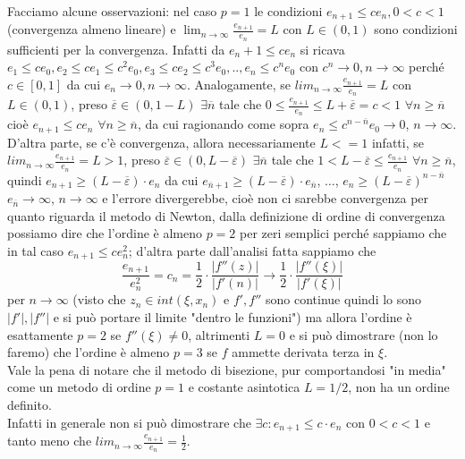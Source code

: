 \documentclass[12pt]{article}
\begin{document}
Facciamo alcune osservazioni: nel caso $p=1$ le condizioni $e_{n+1} \leq ce_n, 0<c<1$  (convergenza almeno lineare) e $\lim_{n\to\infty}{\frac{e_{n+1}}{e_n}}=L$ con $L\in(0,1)$ sono condizioni sufficienti per la convergenza. Infatti da $e_n+1\leq ce_n$ si ricava $e_1\leq ce_0, e_2\leq ce_1\leq c^2e_0, e_3 \leq ce_2 \leq c^3e_0,..,e_n \leq c^ne_0$ con $c^n\rightarrow 0,n\rightarrow\infty$ perché $c\in[0,1]$ da cui $e_n\rightarrow 0, n\rightarrow\infty$. Analogamente, se $lim_{n\to \infty}{\frac{e_{n+1}}{e_n}}=L$ con $L\in(0,1)$, preso $\overline{\varepsilon}\in(0,1-L)$ $\exists \overline{n}$ tale che $0\leq\frac{e_{n+1}}{e_n}\leq L+\overline{\varepsilon}=c<1$ $\forall n \geq \overline{n}$ cioè $e_{n+1}\leq ce_n$ $\forall n\geq\overline{n}$, da cui ragionando come sopra $e_n \leq c^{n-\overline{n}}e_0 \rightarrow 0$, $n\rightarrow\infty$.\\
D'altra parte, se c'è convergenza, allora necessariamente $L<=1$ infatti, se $lim_{n \to \infty} \frac{e_{n+1}}{e_n} = L > 1$, preso $\overline{\varepsilon} \in (0, L-\overline{\varepsilon})$ $ \exists \overline{n}$ tale che $1<L-\overline{\varepsilon} \leq \frac{e_{n+1}}{e_n}$ $\forall n \geq \overline{n}$, quindi $e_{n+1} \geq (L-\overline{\varepsilon})\cdot e_n$ da cui $e_{\overline{n}+1} \geq (L-\overline{\varepsilon}) \cdot e_{\overline{n}}$, $\dots$, $e_n \geq (L-\overline{\varepsilon})^{n-\overline{n}}$ $e_{\overline{n}} \to \infty$, $n \to \infty$ e l'errore divergerebbe, cioè non ci sarebbe convergenza per quanto riguarda il metodo di Newton, dalla definizione di ordine di convergenza possiamo dire che l'ordine è almeno $p=2$ per zeri semplici perché sappiamo che in tal caso $e_{n+1} \leq ce^2_n$; d'altra parte dall'analisi fatta sappiamo che
\begin{equation*}
    \frac{e_{n+1}}{e_n^2} = c_n = \frac{1}{2} \cdot \frac{|f''(z)|}{|f'(n)|} \to \frac{1}{2} \cdot \frac{|f''(\xi)|}{|f'(\xi)|}
\end{equation*}
per $n \to \infty$ (visto che $z_n \in int(\xi,x_n)$ e $f', f''$ sono continue quindi lo sono $|f'|, |f''|$ e si può portare il limite "dentro le funzioni") ma allora l'ordine è esattamente $p=2$ se $f''(\xi) \neq 0$, altrimenti $L=0$ e si può dimostrare (non lo faremo) che l'ordine è almeno $p=3$ se $f$ ammette derivata terza in $\xi$.\\
Vale la pena di notare che il metodo di bisezione, pur comportandosi "in media" come un metodo di ordine $p=1$ e costante asintotica $L=1/2$, non ha un ordine definito.\\
Infatti in generale non si può dimostrare che $\exists c: e_{n+1} \leq c\cdot e_n$ con $0<c<1$ e tanto meno che $lim_{n\to \infty} \frac{e_{n+1}}{e_n} = \frac{1}{2}$.\\
\end{document}
